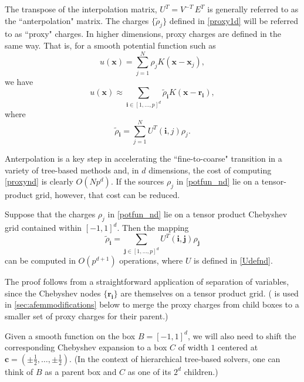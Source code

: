 \documentclass[final,letterpaper]{siamart171218}
\newcommand{\be}{\begin{equation}}
\newcommand{\ee}{\end{equation}}
\newcommand{\x}{\boldsymbol{x}}
\newcommand{\bc}{\boldsymbol{c}}
\newcommand{\bi}{\boldsymbol{i}}
\newcommand{\bj}{\boldsymbol{j}}
\newcommand{\br}{\boldsymbol{r}}
\begin{document}
\begin{definition}\label{anterpdef}
The transpose of the interpolation matrix, $U^T = V^{-T} \, E^T$ is generally
referred to as 
the ``anterpolation" matrix. The charges $\{ \tilde{\rho}_j \}$ defined
in \eqref{proxy1d} will be referred to as ``proxy" charges.
In higher dimensions, proxy charges are defined in the same way. That is,  
for a smooth potential function such as
\be \label{potfun_nd}
u(\x) = \sum_{j=1}^N \rho_j K(\x-\x_j),
\ee
we have
\be
u(\x) \approx \sum_{\bi \in [1,\dots,p]^d} \tilde{\rho}_{\bi} K(\x-\br_{\bi}),
\ee
where
\be \label{proxynd} 
\tilde{\rho}_{\bi} = \sum_{j=1}^N U^T(\bi,j) \rho_j.
\ee
\end{definition}

Anterpolation is a key step in accelerating the ``fine-to-coarse" transition
in a variety of tree-based methods  
\cite{brandt1990jcp,brandt1998,skeel2002,hardy2009pc,multilevel_summation_2015,
multilevel_summation_bspline,tensor_multilevel_ewald} and, in $d$ dimensions,
the cost of computing \eqref{proxynd} is clearly $O(N p^d)$. 
If the sources $\rho_j$ in \eqref{potfun_nd} lie on a tensor-product grid, however, 
that cost can be reduced.

\begin{lemma} \label{ctoplemma}
Suppose that the charges $\rho_{j}$ in \eqref{potfun_nd} 
lie on a tensor product Chebyshev grid contained within $[-1,1]^d$. Then the mapping
\be \label{proxytensor} 
\tilde{\rho}_{\bi} = \sum_{\bj \in [1,\dots,p]^d} U^T(\bi,\bj) \rho_{\bj}
\ee
can be computed in $O(p^{d+1})$ operations, where 
$U$ is defined in \eqref{Udefnd}.
\end{lemma}

The proof follows from a straightforward application of 
separation of variables, since the 
Chebyshev nodes $\{\br_{\bi} \}$ are themselves on a tensor product grid. 
( is used in
\cref{sec:afemmodifications} below
to merge the proxy charges from child boxes to a smaller set of proxy
charges for their parent.)

Given a smooth function on the box $B = [-1,1]^d$, we will also need to shift the
corresponding Chebyshev expansion to a box $C$ of width $1$ centered at
$\bc = (\pm \frac{1}{2},\dots,\pm \frac{1}{2})$. (In the context of hierarchical
tree-based solvers, one can think of $B$ as a parent box and $C$ as one of its 
$2^d$ children.)
\end{document}
